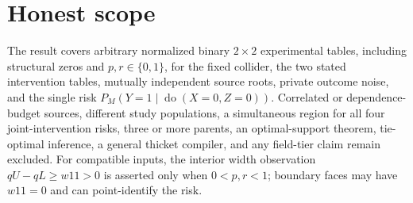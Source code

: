 \documentclass{article}
\begin{document}
\section{Honest scope}

The result covers arbitrary normalized binary \(2\times2\) experimental tables, including structural zeros and \(p,r\in\{0,1\}\), for the fixed collider, the two stated intervention tables, mutually independent source roots, private outcome noise, and the single risk \(P_M(Y=1\mid\operatorname{do}(X=0,Z=0))\).  Correlated or dependence-budget sources, different study populations, a simultaneous region for all four joint-intervention risks, three or more parents, an optimal-support theorem, tie-optimal inference, a general thicket compiler, and any field-tier claim remain excluded.  For compatible inputs, the interior width observation \(qU-qL\ge w11>0\) is asserted only when \(0<p,r<1\); boundary faces may have \(w11=0\) and can point-identify the risk.
\end{document}
